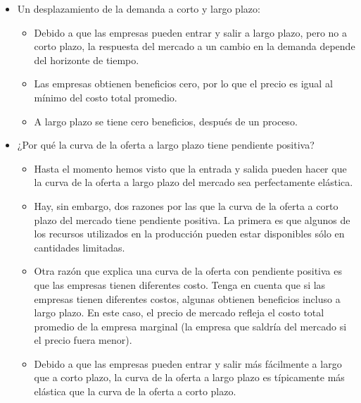 \documentclass{article}
\begin{document}
\begin{itemize}
    \item Un desplazamiento de la demanda a corto y largo plazo:
        \begin{itemize}
            \item Debido a que las empresas pueden entrar y salir a largo plazo, pero no a corto plazo, la respuesta del mercado a un cambio en la demanda depende del horizonte de tiempo.
            \item  Las empresas obtienen beneficios cero, por lo que el precio es igual al mínimo del costo total promedio.
            \item A largo plazo se tiene cero beneficios, después de un proceso.
        \end{itemize}
    
    \item ¿Por qué la curva de la oferta a largo plazo tiene pendiente positiva?
        \begin{itemize}
            \item Hasta el momento hemos visto que la entrada y salida pueden hacer que la curva de la oferta a largo plazo del mercado sea perfectamente elástica.
            \item Hay, sin embargo, dos razones por las que la curva de la oferta a corto plazo del mercado tiene pendiente positiva. La primera es que algunos de los recursos utilizados en la producción pueden estar disponibles sólo en cantidades limitadas.
            \item Otra razón que explica una curva de la oferta con pendiente positiva es que las empresas tienen diferentes costo. Tenga en cuenta que si las empresas tienen diferentes costos, algunas obtienen beneficios incluso a largo plazo. En este caso, el precio de mercado refleja el costo total promedio de la empresa marginal (la empresa que saldría del mercado si el precio fuera menor).
            \item Debido a que las empresas pueden entrar y salir más fácilmente a largo que a corto plazo, la curva de la oferta a largo plazo es típicamente más elástica que la curva de la oferta a corto plazo.
        \end{itemize}
\end{itemize}
\end{document}
